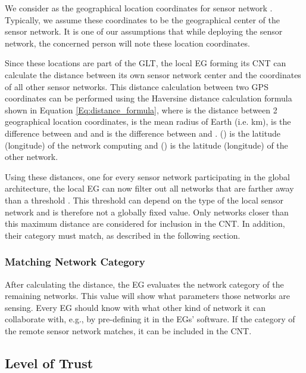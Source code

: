 \documentclass[onecolumn]{jaise2e}
\begin{document}
We consider  as the geographical location coordinates for sensor network . Typically, we assume these coordinates to be the geographical center of the sensor network. It is one of our assumptions that while deploying the sensor network, the concerned person will note these location coordinates.

Since these locations are part of the GLT, the local EG forming its CNT can calculate the distance between its own sensor network center and the coordinates of all other sensor networks. This distance calculation between two GPS coordinates can be performed using the Haversine distance calculation formula shown in Equation \ref{Eq:distance_formula}, where  is the distance between 2 geographical location coordinates,  is the mean radius of Earth (i.e.  km),  is the difference between  and  and  is the difference between  and .  () is the latitude (longitude) of the network computing  and  () is the latitude (longitude) of the other network.

\begin{figure*}[t]

\end{figure*}

Using these distances, one for every sensor network participating in the global architecture, the local EG can now filter out all networks that are farther away than a threshold . This threshold can depend on the type of the local sensor network and is therefore not a globally fixed value. Only networks closer than this maximum distance are considered for inclusion in the CNT. In addition, their category must match, as described in the following section.

\subsubsection{Matching Network Category}

After calculating the distance, the EG evaluates the network category of the remaining networks. This value will show what parameters those networks are sensing. Every EG should know with what other kind of network it can collaborate with, e.g., by pre-defining it in the EGs' software. If the category of the remote sensor network matches, it can be included in the CNT.


\subsection{Level of Trust}\label{subsec:trust_level}
\end{document}
